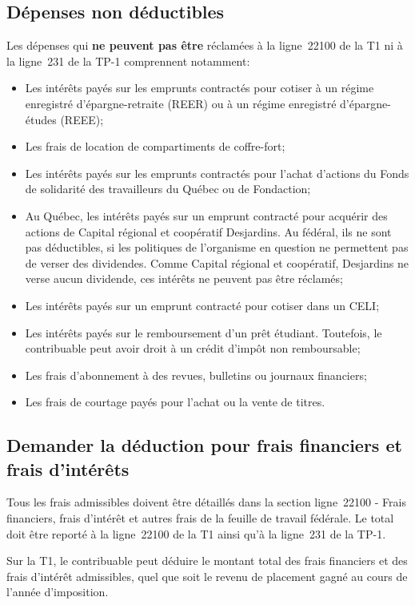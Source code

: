 \subsection{Dépenses non déductibles}
\label{fraisDePlacementDepensesNonDeductibles}
Les dépenses qui \textbf{ne peuvent pas être} réclamées à la ligne~22100 de la T1 ni à la ligne~231 de la TP-1 comprennent notamment:
\begin{itemize}
	\item Les intérêts payés sur les emprunts contractés pour cotiser à un régime enregistré d'épargne-retraite (REER) ou à un régime enregistré d'épargne-études (REEE);
	\item Les frais de location de compartiments de coffre-fort;
	\item Les intérêts payés sur les emprunts contractés pour l'achat d'actions du Fonds de solidarité des travailleurs du Québec ou de Fondaction;
	\item Au Québec, les intérêts payés sur un emprunt contracté pour acquérir des actions de Capital régional et coopératif Desjardins. Au fédéral, ils ne sont pas déductibles, si les politiques de l'organisme en question ne permettent pas de verser des dividendes. Comme Capital régional et coopératif, Desjardins ne verse aucun dividende, ces intérêts ne peuvent pas être réclamés;
	\item Les intérêts payés sur un emprunt contracté pour cotiser dans un CELI;
	\item Les intérêts payés sur le remboursement d'un prêt étudiant. Toutefois, le contribuable peut avoir droit à un crédit d'impôt non remboursable; 
	\item Les frais d'abonnement à des revues, bulletins ou journaux financiers;
	\item Les frais de courtage payés pour l'achat ou la vente de titres.
\end{itemize}


\subsection{Demander la déduction pour frais financiers et frais d'intérêts}
Tous les frais admissibles doivent être détaillés dans la section \og ligne~22100 - Frais financiers, frais d'intérêt et autres frais \fg{} de la feuille de travail fédérale. Le total doit être reporté à la ligne~22100 de la T1 ainsi qu'à la ligne~231 de la TP-1.

Sur la T1, le contribuable peut déduire le montant total des frais financiers et des frais d'intérêt admissibles, quel que soit le revenu de placement gagné au cours de l'année d'imposition.


